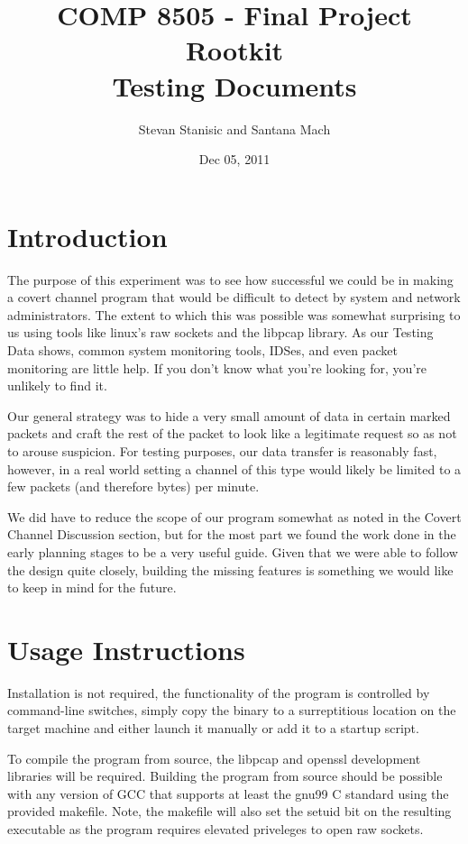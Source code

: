 \documentclass[titlepage]{article}
\begin{document}
\author{Stevan Stanisic and Santana Mach}
\title{COMP 8505 - Final Project \\ Rootkit \\ Testing Documents}
\date{Dec 05, 2011}
\maketitle{}

\tableofcontents
\pagebreak

\section{Introduction}

The purpose of this experiment was to see how successful we could be in making a covert channel program that would be difficult to detect by system and network administrators. The extent to which this was possible was somewhat surprising to us using tools like linux's raw sockets and the libpcap library.  As our Testing Data shows, common system monitoring  tools, IDSes, and even packet monitoring are little help.  If you don't know what you're looking for, you're unlikely to find it.

Our general strategy was to hide a very small amount of data in certain marked packets and craft the rest of the packet to look like a legitimate request so as not to arouse suspicion. For testing purposes, our data transfer is reasonably fast, however, in a real world setting a channel of this type would likely be limited to a few packets (and therefore bytes) per minute.

We did have to reduce the scope of our program somewhat as noted in the Covert Channel Discussion section, but for the most part we found the work done in the early planning stages to be a very useful guide.  Given that we were able to follow the design quite closely, building the missing features is something we would like to keep in mind for the future.

\section{Usage Instructions}

Installation is not required, the functionality of the program is controlled by command-line switches, simply copy the binary to a surreptitious location on the target machine and either launch it manually or add it to a startup script.

To compile the program from source, the libpcap and openssl development libraries will be required.  Building the program from source should be possible with any version of GCC that supports at least the gnu99 C standard using the provided makefile.  Note, the makefile will also set the setuid bit on the resulting executable as the program requires elevated priveleges to open raw sockets.
\end{document}

